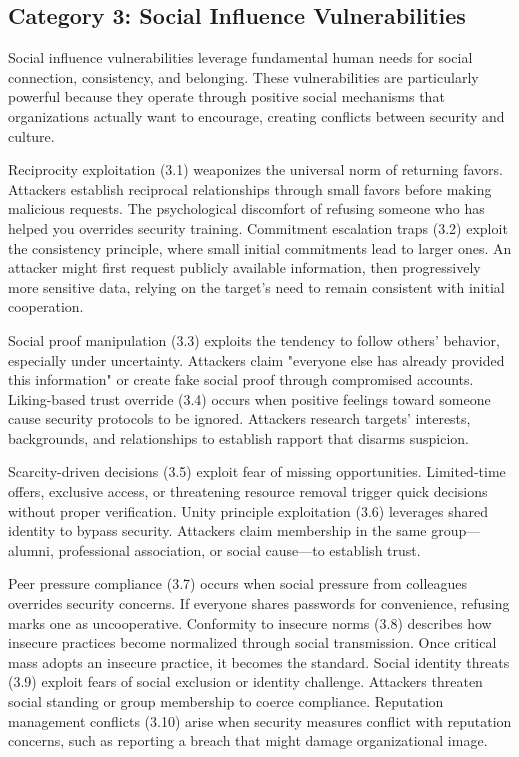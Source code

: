 \documentclass[manuscript,screen,review]{acmart}
\begin{document}
\subsection{Category 3: Social Influence Vulnerabilities}

Social influence vulnerabilities leverage fundamental human needs for social connection, consistency, and belonging. These vulnerabilities are particularly powerful because they operate through positive social mechanisms that organizations actually want to encourage, creating conflicts between security and culture.

Reciprocity exploitation (3.1) weaponizes the universal norm of returning favors. Attackers establish reciprocal relationships through small favors before making malicious requests. The psychological discomfort of refusing someone who has helped you overrides security training. Commitment escalation traps (3.2) exploit the consistency principle, where small initial commitments lead to larger ones. An attacker might first request publicly available information, then progressively more sensitive data, relying on the target's need to remain consistent with initial cooperation.

Social proof manipulation (3.3) exploits the tendency to follow others' behavior, especially under uncertainty. Attackers claim "everyone else has already provided this information" or create fake social proof through compromised accounts. Liking-based trust override (3.4) occurs when positive feelings toward someone cause security protocols to be ignored. Attackers research targets' interests, backgrounds, and relationships to establish rapport that disarms suspicion.

Scarcity-driven decisions (3.5) exploit fear of missing opportunities. Limited-time offers, exclusive access, or threatening resource removal trigger quick decisions without proper verification. Unity principle exploitation (3.6) leverages shared identity to bypass security. Attackers claim membership in the same group—alumni, professional association, or social cause—to establish trust.

Peer pressure compliance (3.7) occurs when social pressure from colleagues overrides security concerns. If everyone shares passwords for convenience, refusing marks one as uncooperative. Conformity to insecure norms (3.8) describes how insecure practices become normalized through social transmission. Once critical mass adopts an insecure practice, it becomes the standard. Social identity threats (3.9) exploit fears of social exclusion or identity challenge. Attackers threaten social standing or group membership to coerce compliance. Reputation management conflicts (3.10) arise when security measures conflict with reputation concerns, such as reporting a breach that might damage organizational image.
\end{document}
